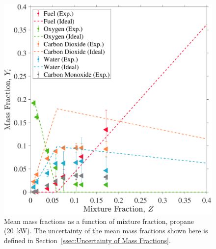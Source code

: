 \documentclass[12pt]{article}
\begin{document}
\begin{figure}[!]
	\centering
\includegraphics[width=\textwidth,keepaspectratio]{Adjusted_FuelPropane 20KW_Mixture_Fraction_Intermediate_Plot.pdf}
	\caption[Mean mass fractions as a function of mixture fraction, propane (20~kW)]{Mean mass fractions as a function of mixture fraction, propane (20~kW). The uncertainty of the mean mass fractions shown here is defined in Section~\ref{ssec:Uncertainty of Mass Fractions}.}
	\label{fig:Propane20kW_Mix_Frac}
\end{figure}
\end{document}
